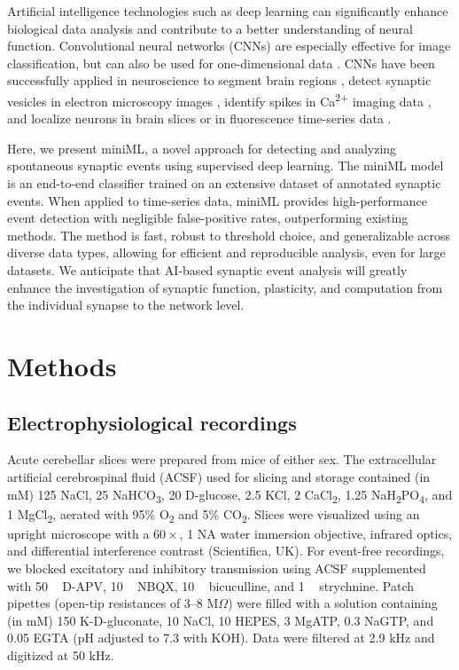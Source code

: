 \documentclass[9pt,lineno]{article}
\begin{document}
Artificial intelligence technologies such as deep learning \citep{LeCun2015} can significantly enhance biological data analysis \citep{Richards2022} and contribute to a better understanding of neural function. Convolutional neural networks (CNNs) are especially effective for image classification, but can also be used for one-dimensional data \citep{Fawaz2019,Wang2016}. CNNs have been successfully applied in neuroscience to segment brain regions \citep{Iqbal2019}, detect synaptic vesicles in electron microscopy images \citep{Imbrosci2022}, identify spikes in Ca\textsuperscript{2+} imaging data \citep{Rupprecht2021}, and localize neurons in brain slices \citep{Yip2021} or in fluorescence time-series data \citep{Denis2020,Sita2022}.

Here, we present miniML, a novel approach for detecting and analyzing spontaneous synaptic events using supervised deep learning. The miniML model is an end-to-end classifier trained on an extensive dataset of annotated synaptic events. When applied to time-series data, miniML provides high-performance event detection with negligible false-positive rates, outperforming existing methods. The method is fast, robust to threshold choice, and generalizable across diverse data types, allowing for efficient and reproducible analysis, even for large datasets. We anticipate that AI-based synaptic event analysis will greatly enhance the investigation of synaptic function, plasticity, and computation from the individual synapse to the network level.

\section{Methods}

\subsection{Electrophysiological recordings}

Acute cerebellar slices were prepared from mice of either sex. The extracellular artificial cerebrospinal fluid (ACSF) used for slicing and storage contained (in mM) 125 NaCl, 25 NaHCO\textsubscript{3}, 20 D-glucose, 2.5 KCl, 2 CaCl\textsubscript{2}, 1.25 NaH\textsubscript{2}PO\textsubscript{4}, and 1 MgCl\textsubscript{2}, aerated with 95\% O\textsubscript{2} and 5\% CO\textsubscript{2}. Slices were visualized using an upright microscope with a $60\times$, 1 NA water immersion objective, infrared optics, and differential interference contrast (Scientifica, UK). For event-free recordings, we blocked excitatory and inhibitory transmission using ACSF supplemented with 50 \si{\micro\Molar} D-APV, 10 \si{\micro\Molar} NBQX, 10 \si{\micro\Molar} bicuculline, and 1 \si{\micro\Molar} strychnine. Patch pipettes (open-tip resistances of 3--8 M$\Omega$) were filled with a solution containing (in mM) 150 K-D-gluconate, 10 NaCl, 10 HEPES, 3 MgATP, 0.3 NaGTP, and 0.05 EGTA (pH adjusted to 7.3 with KOH). Data were filtered at 2.9 kHz and digitized at 50 kHz.
\end{document}
